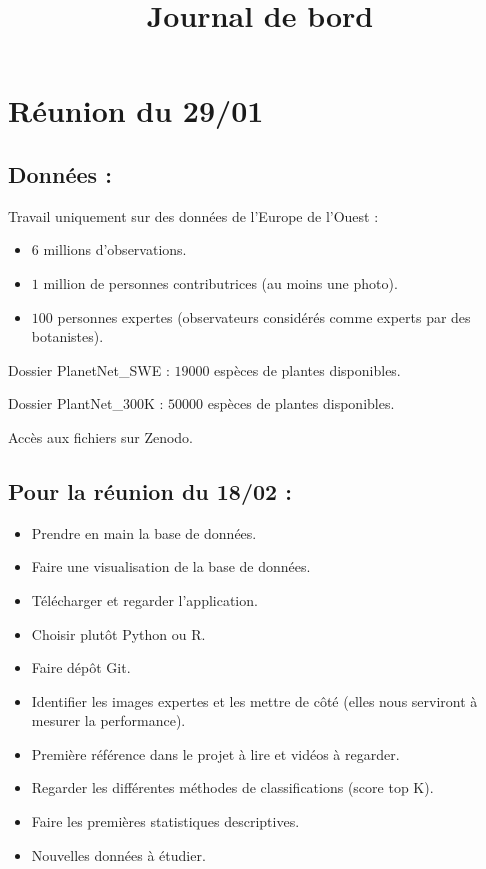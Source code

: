 \documentclass[french]{article}
\title{Journal de bord}
\begin{document}
\maketitle

\section{Réunion du 29/01}

\subsection{Données :}

Travail uniquement sur des données de l'Europe de l'Ouest : 

\begin{itemize}
    \item $6$ millions d'observations.
    \item $1$ million de personnes contributrices (au moins une photo).
    \item $100$ personnes expertes (observateurs considérés comme experts par des botanistes).
\end{itemize}

\vspace{0.2cm}

Dossier PlanetNet\_SWE :
$19000$ espèces de plantes disponibles.

Dossier PlantNet\_300K :
$50 000$ espèces de plantes disponibles.

Accès aux fichiers sur Zenodo.

\subsection{Pour la réunion du 18/02 :}

\begin{itemize}
    \item Prendre en main la base de données.
    \item Faire une visualisation de la base de données.
    \item Télécharger et regarder l'application.
    \item Choisir plutôt Python ou R.
    \item Faire dépôt Git.
    \item Identifier les images expertes et les mettre de côté (elles nous serviront à mesurer la performance).
    \item Première référence dans le projet à lire et vidéos à regarder.
    \item Regarder les différentes méthodes de classifications (score top K).
    \item Faire les premières statistiques descriptives.
    \item Nouvelles données à étudier.
\end{itemize}
\end{document}
